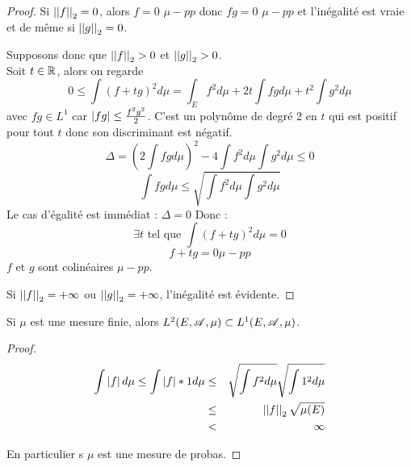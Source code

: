 \begin{proof}
	Si $\left|\left|f\right|\right|_2 = 0$, alors $f = 0$ $\mu-pp$ donc $fg = 0$ $\mu-pp$ et l'inégalité est vraie et de
	même si $\left|\left|g\right|\right|_2 = 0$.

	Supposons donc que $\left|\left|f\right|\right|_2 > 0$ et $\left|\left|g\right|\right|_2 > 0$.\\
	Soit $t \in \mathbb{R}$, alors on regarde
	$$ 0 \leq \int (f + tg)^2 d \mu = \int_E f^2 d \mu + 2t \int fg d \mu + t^2 \int g^2 d \mu$$
	avec $fg \in L^1$ car $\left|fg\right| \leq \frac{f^2g^2}{2}$.
	C'est un polynôme de degré 2 en $t$ qui est positif pour tout $t$ donc son discriminant est négatif.
	$$  \Delta = (2 \int fg d \mu)^2 - 4 \int f^2 d \mu \int g^2 d \mu \leq 0$$
	$$ \int fg d \mu \leq \sqrt{\int f^2 d \mu \int g^2 d \mu}$$
	Le cas d'égalité est immédiat : $\Delta = 0$ Donc :
	$$\exists t \text { tel que } \int (f + tg)^2 d \mu  = 0$$
	$$ f + tg = 0  \mu-pp$$
	$f$ et $g$ sont colinéaires $\mu-pp$.

	Si $\left|\left|f\right|\right|_2 = +  \infty$ ou $\left|\left|g\right|\right|_2 = +  \infty$, l'inégalité est évidente.
\end{proof}

\begin{coro}
	Si $\mu$ est une mesure finie, alors $L^2(E, \mathscr{A}, \mu) \subset L^1(E, \mathscr{A}, \mu)$.
\end{coro}

\begin{proof}
	\begin{eqnarray*}
		\int \left|f\right| d \mu \leq \int \left|f\right|*1 d \mu &\leq& \sqrt{\int f^2 d \mu} \sqrt{\int 1^2 d \mu} \\
		& \leq & \left|\left|f\right|\right|_2 \sqrt{\mu(E)} \\
		& < & \infty
	\end{eqnarray*}

	En particulier s $\mu$ est une mesure de probas.
\end{proof}



